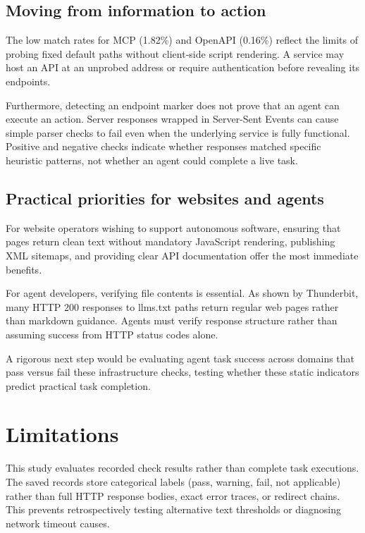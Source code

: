 \documentclass{article}
\begin{document}
\subsection{Moving from information to action}

The low match rates for MCP (1.82\%) and OpenAPI (0.16\%) reflect the limits of probing fixed default paths without client-side script rendering. A service may host an API at an unprobed address or require authentication before revealing its endpoints.

Furthermore, detecting an endpoint marker does not prove that an agent can execute an action. Server responses wrapped in Server-Sent Events can cause simple parser checks to fail even when the underlying service is fully functional. Positive and negative checks indicate whether responses matched specific heuristic patterns, not whether an agent could complete a live task.

\subsection{Practical priorities for websites and agents}

For website operators wishing to support autonomous software, ensuring that pages return clean text without mandatory JavaScript rendering, publishing XML sitemaps, and providing clear API documentation offer the most immediate benefits. 

For agent developers, verifying file contents is essential. As shown by Thunderbit, many HTTP 200 responses to llms.txt paths return regular web pages rather than markdown guidance. Agents must verify response structure rather than assuming success from HTTP status codes alone.

A rigorous next step would be evaluating agent task success across domains that pass versus fail these infrastructure checks, testing whether these static indicators predict practical task completion.

\section{Limitations}

This study evaluates recorded check results rather than complete task executions. The saved records store categorical labels (pass, warning, fail, not applicable) rather than full HTTP response bodies, exact error traces, or redirect chains. This prevents retrospectively testing alternative text thresholds or diagnosing network timeout causes.
\end{document}
